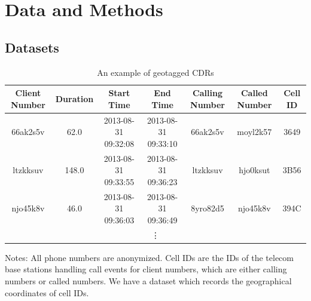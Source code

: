 
\chapter{Data and Methods}
\section{Datasets}
\begin{table}[htbp]
\renewcommand{\arraystretch}{1.6}
\setlength{\tabcolsep}{1.9mm}{}
\centering
\scriptsize
\caption{An example of geotagged CDRs}

\begin{tabular}{ccccccc}
\hline

\textbf{Client Number} & \textbf{Duration} & \textbf{Start Time} & \textbf{End Time} & \textbf{Calling Number} & \textbf{Called Number} & \textbf{Cell ID} \\ \hline

66ak2s5v & 62.0 & 2013-08-31 09:32:08 & 2013-08-31 09:33:10 & 66ak2s5v & moyl2k57 & 3649 \\

ltzkksuv & 148.0 & 2013-08-31 09:33:55 & 2013-08-31 09:36:23 & ltzkksuv & hjo0ksut & 3B56 \\

njo45k8v & 46.0 & 2013-08-31 09:36:03 & 2013-08-31 09:36:49 & 8yro82d5 & njo45k8v & 394C \\

\multicolumn{7}{c}{\vdots} \\
\hline
\end{tabular}%

\label{tab:example_cdr}
\end{table}

\vspace{-2em}
\begin{singlespace}
\begin{footnotesize}
\noindent Notes: All phone numbers are anonymized. Cell IDs are the IDs of the telecom base stations handling call events for client numbers, which are either calling numbers or called numbers. We have a dataset which records the geographical coordinates of cell IDs.
\end{footnotesize}
\end{singlespace}


